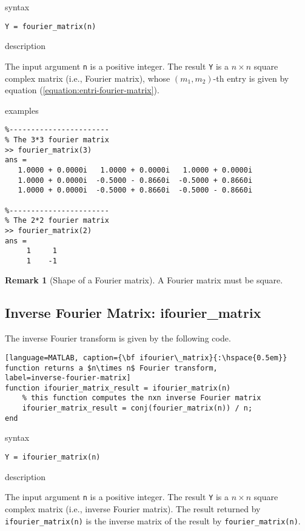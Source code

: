 \documentclass[12pt,reqno]{amsart}
\numberwithin{equation}{section}
\numberwithin{figure}{section}
\numberwithin{table}{section}
\theoremstyle{definition}
\newtheorem{remarks}[theorem]{Remark}
\begin{document}
\noindent 
{\color{red} \sc syntax}

{\tt  Y = fourier\_matrix(n) }


\noindent
{\color{red} \sc description}

The input argument {\tt n} is a positive integer. The result {\tt Y} is a $n\times n$ square complex matrix (i.e., Fourier matrix), whose $(m_1, m_2)$-th entry is given by equation (\ref{equation:entri-fourier-matrix}). 


\noindent
{\color{red} \sc examples}
\begin{verbatim}
%-----------------------   
% The 3*3 fourier matrix  
>> fourier_matrix(3)
ans =
   1.0000 + 0.0000i   1.0000 + 0.0000i   1.0000 + 0.0000i
   1.0000 + 0.0000i  -0.5000 - 0.8660i  -0.5000 + 0.8660i
   1.0000 + 0.0000i  -0.5000 + 0.8660i  -0.5000 - 0.8660i

%-----------------------   
% The 2*2 fourier matrix    
>> fourier_matrix(2)
ans = 
     1     1
     1    -1
\end{verbatim}

\begin{remarks}[Shape of a Fourier matrix]
A Fourier matrix must be square. 
\end{remarks}


\subsection{{\color{blue} \sc Inverse Fourier Matrix}: {\color{blue}ifourier\_matrix}}
The inverse Fourier transform is given by the following code. 

\begin{lstlisting}[language=MATLAB, caption={\bf ifourier\_matrix}{:\hspace{0.5em}} 
function returns a $n\times n$ Fourier transform, 
label=inverse-fourier-matrix] 
function ifourier_matrix_result = ifourier_matrix(n)
	% this function computes the nxn inverse Fourier matrix 
	ifourier_matrix_result = conj(fourier_matrix(n)) / n; 
end
\end{lstlisting} 


\noindent 
{\color{red} \sc syntax}

{\tt  Y = ifourier\_matrix(n) }


\noindent
{\color{red} \sc description}

The input argument {\tt n} is a positive integer. The result {\tt Y} is a $n\times n$ square complex matrix (i.e., inverse Fourier matrix). The result returned by {\tt ifourier\_matrix(n)} is the inverse matrix of the result by {\tt fourier\_matrix(n)}. 
\end{document}
